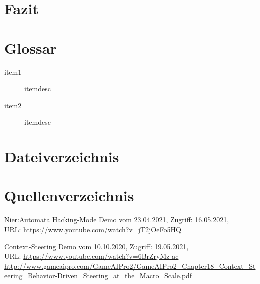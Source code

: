 \documentclass[a4paper,10pt,ngerman,fontsize=12pt]{scrreprt}
\begin{document}
\lipsum[3]





\chapter{Fazit}

\lipsum[3]





\chapter{Glossar}

\begin{description}
\item[item1] itemdesc
\item[item2] itemdesc
\end{description}




\chapter{Dateiverzeichnis}




\chapter{Quellenverzeichnis}

\begin{thebibliography}{999}

 Nier:Automata Hacking-Mode Demo vom 23.04.2021,  Zugriff:  16.05.2021, \\ URL:
\url{https://www.youtube.com/watch?v=jT2jOeFo5HQ}

 Context-Steering Demo vom 10.10.2020,  Zugriff:  19.05.2021, \\ URL:
\url{https://www.youtube.com/watch?v=6BrZryMz-ac}
\url{http://www.gameaipro.com/GameAIPro2/GameAIPro2_Chapter18_Context_Steering_Behavior-Driven_Steering_at_the_Macro_Scale.pdf}

\end{thebibliography}
    
\end{document}
